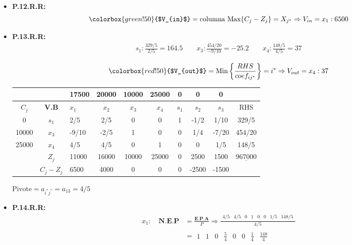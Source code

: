 \documentclass{templateNote}
\begin{document}
\begin{itemize}
    \item \textbf{P.12.R.R:}
    \begin{equation*}
        \colorbox{green!50}{$V_{in}$} = \text{columna Max} \{C_j-Z_j\} = X_{j^*} \Rightarrow V_{in} = x_1 : 6500
    \end{equation*}

    \item \textbf{P.13.R.R:}
    \begin{align*}
        s_1: \frac{329/5}{2/5} = 164.5 \qquad x_3: \frac{454/20}{-9/10} = -25.2 \qquad x_4: \frac{148/5}{4/5} = 37 \\
    \end{align*}
    \begin{equation*}
        \colorbox{red!50}{$V_{out}$} = \text{Min} \left\{ \frac{RHS}{coef_{ij^*}} \right\} = i^* \Rightarrow V_{out} = x_4 : 37
    \end{equation*}

    \begin{center}
        \begin{tabular}{|c|c|g|c|c|c|c|c|c|c|}
            \hline
            & & 17500 & 20000 & 10000 & 25000 & 0 & 0 & 0 & \\ \hline
            $C_j$ & \textbf{V.B} & $x_1$ & $x_2$ & $x_3$ & $x_4$ & $s_1$ & $s_2$ & $s_3$ & RHS \\  & $s_1$ & 2/5 & 2/5 & 0 & 0 & 1 & -1/2 & 1/10 & 329/5 \\
            10000 & $x_3$ & -9/10 & -2/5 & 1 & 0 & 0 & 1/4 & -7/20 & 454/20 \\
            25000 & $x_4$ & 4/5 & 4/5 & 0 & 1 & 0 & 0 & 1/5 & 148/5 \\ \hline
            & $Z_j$ & 11000 & 16000 & 10000 & 25000 & 0 & 2500 & 1500 & $\underline{967000}$ \\ \hline
            & $C_j - Z_j$ & 6500 & 4000 & 0 & 0 & 0 & -2500 & -1500 & \\ \hline
        \end{tabular}
    \end{center}
    \begin{center}
        $\text{Pivote} = a_{i^*j^*} = a_{13} = 4/5$
    \end{center}

    \item \textbf{P.14.R.R:}
    \begin{align*}
        x_1: \quad \textbf{N.E.P} &= \frac{\textbf{E.P.A}}{P} \Rightarrow \frac{\begin{array}{cccccccc} 4/5 & 4/5 & 0 & 1 & 0 & 0 & 1/5 & 148/5\end{array}}{4/5} \\
        &= \begin{array}{cccccccc} 1 & 1 & 0 & \frac{5}{4} & 0 & 0 & \frac{1}{4} & \frac{148}{4}\end{array}
    \end{align*}


\end{itemize}
\end{document}
